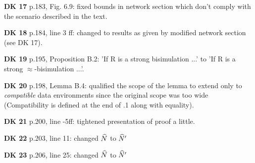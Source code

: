 \documentclass{article}
\begin{document}
\begin{trivlist}
\item[\bf DK 17] p.183, Fig. 6.9: fixed bounds in network section which don't
comply with the scenario described in the text.
\item[\bf DK 18] p.184, line 3 ff: changed to results as given by modified
  network section (see DK 17).
\item[\bf DK 19] p.195, Proposition B.2: 'If R is a strong bisimulation ...'
  to 'If R is a strong $\approx$-bisimulation ...'.
\item[\bf DK 20] p.198, Lemma B.4: qualified the scope of the lemma to
  extend only to \emph{compatible} data environments since the original
  scope was too wide (Compatibility is defined at the end of .1
  along with equality).
\item[\bf DK 21] p.200, line -5ff: tightened presentation of proof a little.
\item[\bf DK 22] p.203, line 11: changed ${\widehat{N}}$ to ${\widehat{N}}'$
\item[\bf DK 23] p.206, line 25: changed ${\widehat{N}}$ to ${\widehat{N}}'$
\end{trivlist}
\end{document}
